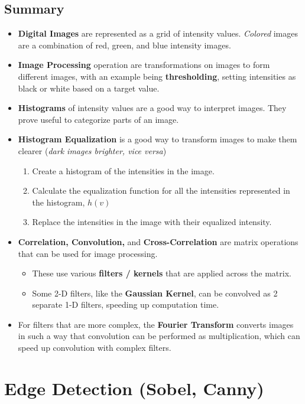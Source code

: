 \documentclass{article}
\begin{document}
\subsection{Summary}
\begin{itemize}
    \item \textbf{Digital Images} are represented as a grid of intensity values. \textit{Colored} images are a combination of red, green, and blue intensity images.
    \item \textbf{Image Processing} operation are transformations on images to form different images, with an example being \textbf{thresholding}, setting intensities as black or white based on a target value.
    \item \textbf{Histograms} of intensity values are a good way to interpret images. They prove useful to categorize parts of an image.
    \item \textbf{Histogram Equalization} is a good way to transform images to make them clearer (\textit{dark images brighter, vice versa})
    \begin{enumerate}
        \item Create a histogram of the intensities in the image.
        \item Calculate the equalization function for all the intensities represented in the histogram, $h(v)$
        \item Replace the intensities in the image with their equalized intensity.
    \end{enumerate}
    \item \textbf{Correlation, Convolution,} and \textbf{Cross-Correlation} are matrix operations that can be used for image processing.
    \begin{itemize}
        \item These use various \textbf{filters / kernels} that are applied across the matrix.
        \item Some 2-D filters, like the \textbf{Gaussian Kernel}, can be convolved as 2 separate 1-D filters, speeding up computation time. 
    \end{itemize}
    \item For filters that are more complex, the \textbf{Fourier Transform} converts images in such a way that convolution can be performed as multiplication, which can speed up convolution with complex filters. 
\end{itemize}

\section{Edge Detection (Sobel, Canny)}
\end{document}
